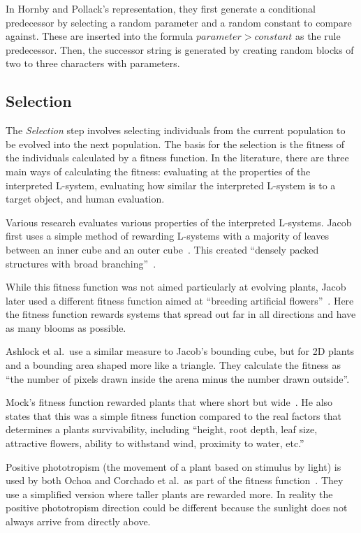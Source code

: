 In Hornby and Pollack's representation, they first generate a conditional predecessor by selecting a random parameter and a random constant to compare against.
These are inserted into the formula $parameter > constant$ as the rule predecessor.
Then, the successor string is generated by creating random blocks of two to three characters with parameters.~\cite{2001Hornby}

\subsection{Selection}
The \textit{Selection} step involves selecting individuals from the current population to be evolved into the next population.
The basis for the selection is the fitness of the individuals calculated by a fitness function.
In the literature, there are three main ways of calculating the fitness: evaluating at the properties of the interpreted \gls{L-system}, evaluating how similar the interpreted \gls{L-system} is to a target object, and human evaluation.

Various research evaluates various properties of the interpreted \glspl{L-system}.
Jacob first uses a simple method of rewarding \glspl{L-system} with a majority of leaves between an inner cube and an outer cube~\cite{1994Jacob}.
This created ``densely packed structures with broad branching''~\cite{1994Jacob}.

While this fitness function was not aimed particularly at evolving plants, Jacob later used a different fitness function aimed at ``breeding artificial flowers''~\cite{1994Jacob}.
Here the fitness function rewards systems that spread out far in all directions and have as many blooms as possible.

Ashlock et al.\ use a similar measure to Jacob's bounding cube, but for 2D plants and a bounding area shaped more like a triangle.
They calculate the fitness as ``the number of pixels drawn inside the arena minus the number drawn outside''.
~\cite{2006Ashlock}

Mock's fitness function rewarded plants that where short but wide~\cite{1998Mock}.
He also states that this was a simple fitness function compared to the real factors that determines a plants survivability, including ``height, root depth, leaf size, attractive flowers, ability to withstand wind, proximity to water, etc.''~\cite{1998Mock}

Positive phototropism (the movement of a plant based on stimulus by light) is used by both Ochoa and Corchado et al.\ as part of the fitness function~\cite{1998Ochoa, 2009Corchado}.
They use a simplified version where taller plants are rewarded more.
In reality the positive phototropism direction could be different because the sunlight does not always arrive from directly above.

